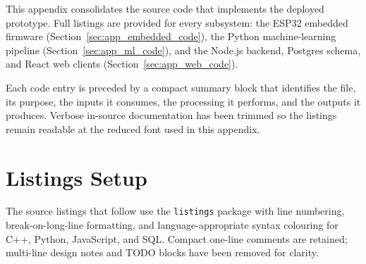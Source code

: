 This appendix consolidates the source code that implements the deployed prototype. Full listings are provided for every subsystem: the ESP32 embedded firmware (Section~\ref{sec:app_embedded_code}), the Python machine-learning pipeline (Section~\ref{sec:app_ml_code}), and the Node.js backend, Postgres schema, and React web clients (Section~\ref{sec:app_web_code}).

Each code entry is preceded by a compact summary block that identifies the file, its purpose, the inputs it consumes, the processing it performs, and the outputs it produces. Verbose in-source documentation has been trimmed so the listings remain readable at the reduced font used in this appendix.

\section{Listings Setup}

The source listings that follow use the \texttt{listings} package with line numbering, break-on-long-line formatting, and language-appropriate syntax colouring for C++, Python, JavaScript, and SQL. Compact one-line comments are retained; multi-line design notes and TODO blocks have been removed for clarity.

\FloatBarrier


\FloatBarrier


\FloatBarrier

